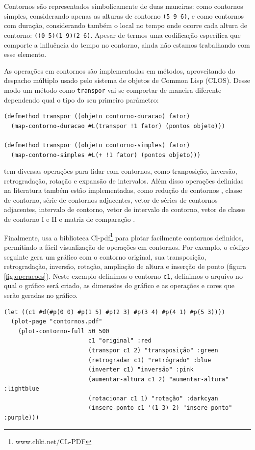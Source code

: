 Contornos são representados simbolicamente de duas maneiras: como
contornos simples, considerando apenas as alturas de contorno
\verb!(5 9 6)!, e como contornos com duração, considerando também o
local no tempo onde ocorre cada altura de contorno:
\verb!((0 5)(1 9)(2 6)!. Apesar de termos uma codificação específica
que comporte a influência do tempo no contorno, ainda não estamos
trabalhando com esse elemento.

As operações em contornos são implementadas em métodos, aproveitando
do despacho múltiplo usado pelo sistema de objetos de Common Lisp
(CLOS). Desse modo um método como \texttt{transpor} vai se comportar
de maneira diferente dependendo qual o tipo do seu primeiro parâmetro:

\begin{verbatim}
(defmethod transpor ((objeto contorno-duracao) fator)
  (map-contorno-duracao #L(transpor !1 fator) (pontos objeto)))

(defmethod transpor ((objeto contorno-simples) fator)
  (map-contorno-simples #L(+ !1 fator) (pontos objeto)))
\end{verbatim}

\goiaba{} tem diversas operações para lidar com contornos, como
tranposição, inversão, retrogradação, rotação e expansão de
intervalos. Além disso operações definidas na literatura também estão
implementadas, como redução de contornos \cite{adams76:melodic},
classe de contorno, série de contornos adjacentes, vetor de séries de
contornos adjacentes, intervalo de contorno, vetor de intervalo de
contorno, vetor de classe de contorno I e II
\cite{friedmann85:methodology} e matriz de comparação
\cite{morris93:directions}.

Finalmente, \goiaba{} usa a biblioteca
Cl-pdf\footnote{www.cliki.net/CL-PDF} para plotar facilmente contornos
definidos, permitindo a fácil visualização de operações em contornos.
Por exemplo, o código seguinte gera um gráfico com o contorno
original, sua transposição, retrogradação, inversão, rotação,
ampliação de altura e inserção de ponto (figura
\ref{fig:operacoes}). Neste exemplo definimos o contorno \verb!c1!,
definimos o arquivo no qual o gráfico será criado, as dimensões do
gráfico e as operações e cores que serão geradas no gráfico.

\break
\begin{verbatim}
(let ((c1 #d(#p(0 0) #p(1 5) #p(2 3) #p(3 4) #p(4 1) #p(5 3))))
  (plot-page "contornos.pdf"
    (plot-contorno-full 50 500
                        c1 "original" :red
                        (transpor c1 2) "transposição" :green
                        (retrogradar c1) "retrógrado" :blue
                        (inverter c1) "inversão" :pink
                        (aumentar-altura c1 2) "aumentar-altura" :lightblue
                        (rotacionar c1 1) "rotação" :darkcyan
                        (insere-ponto c1 '(1 3) 2) "insere ponto" :purple)))
\end{verbatim}

